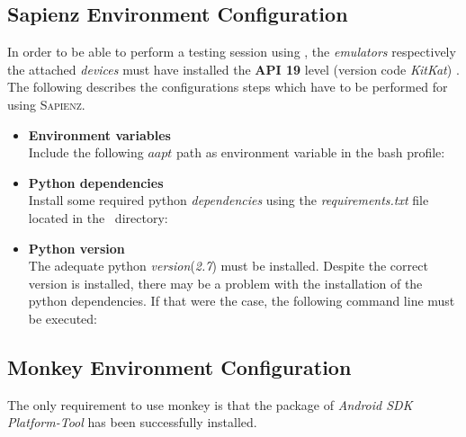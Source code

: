 \subsection{Sapienz Environment Configuration}
In order to be able to perform a testing session using \sapienz, the \textit{emulators} respectively the attached \textit{devices} must have installed the \textbf{API 19} level (version code \textit{KitKat}) \cite{api19}. 
The following describes the configurations steps which have to be performed for using \textsc{Sapienz}. 
\begin{itemize}
\item\textbf{Environment variables} \\ 
Include the following $aapt$ path as environment variable in the bash profile:
\begin{center}
\end{center}

\item \textbf{Python dependencies} \\
Install some required python \textit{dependencies} using the \textit{requirements.txt} file located in the \sapienz\ directory: 
\begin{center}
\end{center}

\item\textbf{Python version} \\
The adequate python \textit{version}(\textit{2.7}) must be installed. 
Despite the correct version is installed, there may be a problem with the installation of the python dependencies. 
If that were the case, the following command line must be executed:  
\begin{center}
\end{center}
\end{itemize}
\subsection{Monkey Environment Configuration}
The only requirement to use monkey is that the package of \textit{Android SDK Platform-Tool} has been successfully installed.

